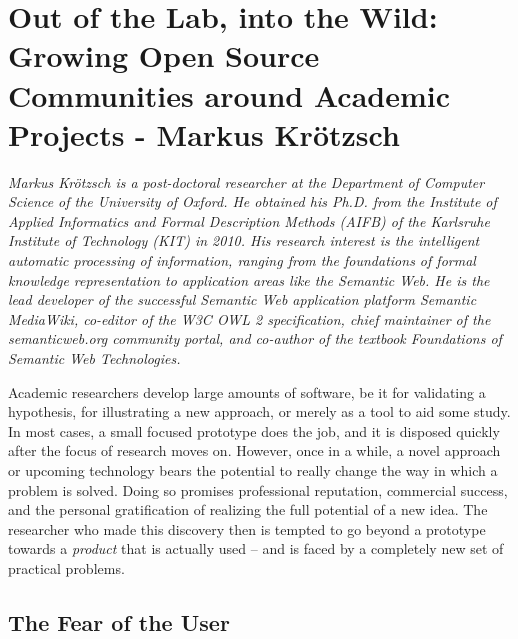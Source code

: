 \chapter{Out of the Lab, into the Wild: Growing Open Source Communities around
Academic Projects - Markus Kr\"{o}tzsch}

\textit{Markus Kr\"otzsch is a post-doctoral researcher at the Department of
Computer Science of the University of Oxford. He obtained his Ph.D. from the
Institute of Applied Informatics and Formal Description Methods (AIFB) of the
Karlsruhe Institute of Technology (KIT) in 2010. His research interest is the
intelligent automatic processing of information, ranging from the foundations of
formal knowledge representation to application areas like the Semantic Web. He
is the lead developer of the successful Semantic Web application platform
Semantic MediaWiki, co-editor of the W3C OWL 2 specification, chief maintainer
of the semanticweb.org community portal, and co-author of the textbook
Foundations of Semantic Web Technologies.}

Academic researchers develop large amounts of software, be it for validating a
hypothesis, for illustrating a new approach, or merely as a tool to aid some
study. In most cases, a small focused prototype does the job, and it is
disposed quickly after the focus of research moves on. However, once in a while,
a novel approach or upcoming technology bears the potential to really change the
way in which a problem is solved. Doing so promises professional reputation,
commercial success, and the personal gratification of realizing the full
potential of a new idea. The researcher who made this discovery then is tempted
to go beyond a prototype towards a \emph{product} that is actually used -- and
is faced by a completely new set of practical problems.

\section*{The Fear of the User}


